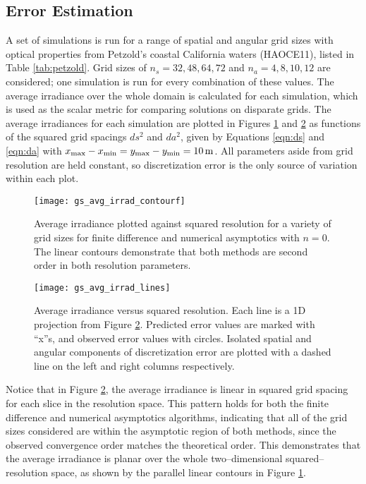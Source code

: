 \subsection{Error Estimation}
A set of simulations is run for a range of spatial and angular grid sizes with optical properties from Petzold's coastal California waters (HAOCE11), listed in Table \ref{tab:petzold}.
Grid sizes of $n_s=32,48,64,72$ and $n_a=4,8,10,12$ are considered; one simulation is run for every combination of these values.
The average irradiance over the whole domain is calculated for each simulation, which is used as the scalar metric for comparing solutions on disparate grids.
The average irradiances for each simulation are plotted in Figures \ref{fig:gs_avg_irrad_contourf} and \ref{fig:gs_avg_irrad_lines} as functions of the squared grid spacings $ds^2$ and $da^2$, given by Equations \eqref{eqn:ds} and \eqref{eqn:da} with $\xmax-\xmin = \ymax-\ymin = \SI{10}{\m}$.
All parameters aside from grid resolution are held constant, so discretization error is the only source of variation within each plot.

\begin{figure}[h]
  \centering
  \texttt{[image: gs\_avg\_irrad\_contourf]}
  \caption{Average irradiance plotted against squared resolution for a variety of grid sizes for finite difference and numerical asymptotics with $n=0$. The linear contours demonstrate that both methods are second order in both resolution parameters.}
  \label{fig:gs_avg_irrad_contourf}
\end{figure}
\begin{figure}[h]
  \centering
  \texttt{[image: gs\_avg\_irrad\_lines]}
  \caption{Average irradiance versus squared resolution. Each line is a 1D projection from Figure \ref{fig:gs_avg_irrad_lines}. Predicted error values are marked with ``x''s, and observed error values with circles. Isolated spatial and angular components of discretization error are plotted with a dashed line on the left and right columns respectively.}
  \label{fig:gs_avg_irrad_lines}
\end{figure}

Notice that in Figure \ref{fig:gs_avg_irrad_lines}, the average irradiance is linear in squared grid spacing for each slice in the resolution space.
This pattern holds for both the finite difference and numerical asymptotics algorithms, indicating that all of the grid sizes considered are within the asymptotic region of both methods, since the observed convergence order matches the theoretical order.
This demonstrates that the average irradiance is planar over the whole two--dimensional squared--resolution space, as shown by the parallel linear contours in Figure \ref{fig:gs_avg_irrad_contourf}.

